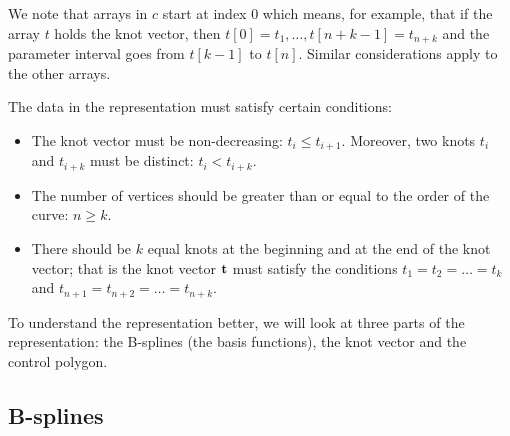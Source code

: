 We note that arrays in $c$ start at index 0 which means,
for example, that if the array $t$ holds the knot vector,
then $t[0] = t_1,\ldots, t[n+k-1] = t_{n+k}$
and the parameter interval goes from
$t[k-1]$ to $t[n]$. Similar considerations apply to the other arrays.

The data in the representation must satisfy certain conditions:
\begin{itemize}
\item The knot vector must be non-decreasing: $t_i \le t_{i+1}$.
      Moreover, two knots $t_i$ and $t_{i+k}$ must be distinct:
      $t_i < t_{i+k}$.
\item The number of vertices should be greater than or equal
      to the order of the curve: $n \ge k$.
\item There should be $k$ equal knots at the beginning and at the end
      of the knot vector; that is the knot vector ${\bf t}$
      must satisfy the conditions $t_1 = t_2 = \ldots = t_k$
      and $t_{n+1} = t_{n+2} = \ldots = t_{n + k}$.
\end{itemize}

To understand the representation better, we will look at
three parts of the
representation: the B-splines (the basis functions),
the knot vector and the control polygon.

\subsection{B-splines}

